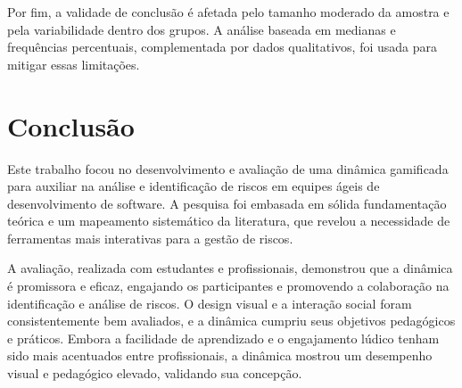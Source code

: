 \documentclass[12pt]{article}
\begin{document}
Por fim, a validade de conclusão é afetada pelo tamanho moderado da amostra e pela variabilidade dentro dos grupos. A análise baseada em medianas e frequências percentuais, complementada por dados qualitativos, foi usada para mitigar essas limitações.

\section{Conclusão}

Este trabalho focou no desenvolvimento e avaliação de uma dinâmica gamificada para auxiliar na análise e identificação de riscos em equipes ágeis de desenvolvimento de software. A pesquisa foi embasada em sólida fundamentação teórica e um mapeamento sistemático da literatura, que revelou a necessidade de ferramentas mais interativas para a gestão de riscos.

A avaliação, realizada com estudantes e profissionais, demonstrou que a dinâmica é promissora e eficaz, engajando os participantes e promovendo a colaboração na identificação e análise de riscos. O design visual e a interação social foram consistentemente bem avaliados, e a dinâmica cumpriu seus objetivos pedagógicos e práticos. Embora a facilidade de aprendizado e o engajamento lúdico tenham sido mais acentuados entre profissionais, a dinâmica mostrou um desempenho visual e pedagógico elevado, validando sua concepção.



\end{document}
